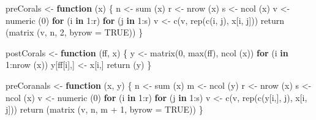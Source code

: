 \documentclass[
  12pt,
]{book}
\newenvironment{Shaded}{\begin{snugshade}}{\end{snugshade}}
\newcommand{\AttributeTok}[1]{\textcolor[rgb]{0.77,0.63,0.00}{#1}}
\newcommand{\ConstantTok}[1]{\textcolor[rgb]{0.00,0.00,0.00}{#1}}
\newcommand{\ControlFlowTok}[1]{\textcolor[rgb]{0.13,0.29,0.53}{\textbf{#1}}}
\newcommand{\DecValTok}[1]{\textcolor[rgb]{0.00,0.00,0.81}{#1}}
\newcommand{\FunctionTok}[1]{\textcolor[rgb]{0.00,0.00,0.00}{#1}}
\newcommand{\NormalTok}[1]{#1}
\newcommand{\OtherTok}[1]{\textcolor[rgb]{0.56,0.35,0.01}{#1}}
\newcommand{\SpecialCharTok}[1]{\textcolor[rgb]{0.00,0.00,0.00}{#1}}
\begin{document}
\begin{Shaded}
\begin{Highlighting}[]
\NormalTok{preCorals }\OtherTok{\textless{}{-}} \ControlFlowTok{function}\NormalTok{ (x) \{}
\NormalTok{  n }\OtherTok{\textless{}{-}} \FunctionTok{sum}\NormalTok{ (x)}
\NormalTok{  r }\OtherTok{\textless{}{-}} \FunctionTok{nrow}\NormalTok{ (x)}
\NormalTok{  s }\OtherTok{\textless{}{-}} \FunctionTok{ncol}\NormalTok{ (x)}
\NormalTok{  v }\OtherTok{\textless{}{-}} \FunctionTok{numeric}\NormalTok{ (}\DecValTok{0}\NormalTok{)}
  \ControlFlowTok{for}\NormalTok{ (i }\ControlFlowTok{in} \DecValTok{1}\SpecialCharTok{:}\NormalTok{r)}
    \ControlFlowTok{for}\NormalTok{ (j }\ControlFlowTok{in} \DecValTok{1}\SpecialCharTok{:}\NormalTok{s)}
\NormalTok{      v }\OtherTok{\textless{}{-}} \FunctionTok{c}\NormalTok{(v, }\FunctionTok{rep}\NormalTok{(}\FunctionTok{c}\NormalTok{(i, j), x[i, j]))}
  \FunctionTok{return}\NormalTok{ (}\FunctionTok{matrix}\NormalTok{ (v, n, }\DecValTok{2}\NormalTok{, }\AttributeTok{byrow =} \ConstantTok{TRUE}\NormalTok{))}
\NormalTok{\}}

\NormalTok{postCorals }\OtherTok{\textless{}{-}} \ControlFlowTok{function}\NormalTok{ (ff, x) \{}
\NormalTok{  y }\OtherTok{\textless{}{-}} \FunctionTok{matrix}\NormalTok{(}\DecValTok{0}\NormalTok{, }\FunctionTok{max}\NormalTok{(ff), }\FunctionTok{ncol}\NormalTok{ (x))}
  \ControlFlowTok{for}\NormalTok{ (i }\ControlFlowTok{in} \DecValTok{1}\SpecialCharTok{:}\FunctionTok{nrow}\NormalTok{ (x))}
\NormalTok{    y[ff[i],] }\OtherTok{\textless{}{-}}\NormalTok{ x[i,]}
  \FunctionTok{return}\NormalTok{ (y)}
\NormalTok{\}}

\NormalTok{preCoranals }\OtherTok{\textless{}{-}} \ControlFlowTok{function}\NormalTok{ (x, y) \{}
\NormalTok{  n }\OtherTok{\textless{}{-}} \FunctionTok{sum}\NormalTok{ (x)}
\NormalTok{  m }\OtherTok{\textless{}{-}} \FunctionTok{ncol}\NormalTok{ (y)}
\NormalTok{  r }\OtherTok{\textless{}{-}} \FunctionTok{nrow}\NormalTok{ (x)}
\NormalTok{  s }\OtherTok{\textless{}{-}} \FunctionTok{ncol}\NormalTok{ (x)}
\NormalTok{  v }\OtherTok{\textless{}{-}} \FunctionTok{numeric}\NormalTok{ (}\DecValTok{0}\NormalTok{)}
  \ControlFlowTok{for}\NormalTok{ (i }\ControlFlowTok{in} \DecValTok{1}\SpecialCharTok{:}\NormalTok{r)}
    \ControlFlowTok{for}\NormalTok{ (j }\ControlFlowTok{in} \DecValTok{1}\SpecialCharTok{:}\NormalTok{s)}
\NormalTok{      v }\OtherTok{\textless{}{-}} \FunctionTok{c}\NormalTok{(v, }\FunctionTok{rep}\NormalTok{(}\FunctionTok{c}\NormalTok{(y[i,], j), x[i, j]))}
  \FunctionTok{return}\NormalTok{ (}\FunctionTok{matrix}\NormalTok{ (v, n, m }\SpecialCharTok{+} \DecValTok{1}\NormalTok{, }\AttributeTok{byrow =} \ConstantTok{TRUE}\NormalTok{))}
\NormalTok{\}}


\end{Highlighting}
\end{Shaded}
\end{document}
